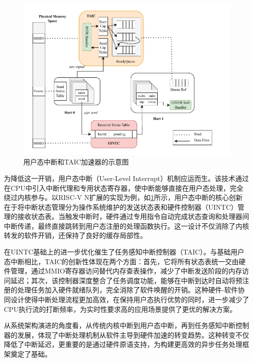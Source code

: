 \begin{figure}[htbp]
    \centering
    \includegraphics[width=1.0\textwidth]{figures/uintc_taic.drawio.pdf}
    \caption{用户态中断和TAIC加速器的示意图}\label{fig:uintc_taic}
\end{figure}

为降低这一开销，用户态中断（User-Level Interrupt）\cite{mehta2021x86}机制应运而生。该技术通过在CPU中引入中断代理和专用状态寄存器，使中断能够直接在用户态处理，完全绕过内核参与。以RISC-V N扩展的实现为例，如\ref{fig:uintc_taic}所示，用户态中断的核心创新在于将中断状态管理分为操作系统维护的发送状态表和硬件控制器（UINTC）管理的接收状态表。当触发中断时，硬件通过专用指令自动完成状态查询和处理器间中断传递，最终直接跳转到用户态注册的处理函数执行。这一设计不仅消除了内核转发的软件开销，还保持了良好的缓存局部性。


在UINTC基础上的进一步优化催生了任务感知中断控制器（TAIC）\cite{taic_github}。与基础用户态中断相比，TAIC的创新性体现在两个方面：首先，它将所有状态表统一交由硬件管理，通过MMIO寄存器访问替代内存查表操作，减少了中断发送阶段的内存访问延迟；其次，该控制器深度整合了任务调度功能，能够在中断到达时自动将预注册的处理任务加入硬件就绪队列，完全消除了软件唤醒的开销。这种硬件-软件协同设计使得中断处理流程更加高效，在保持用户态执行优势的同时，进一步减少了CPU执行流的打断频率，为实时性要求高的应用场景提供了更优的解决方案。

从系统架构演进的角度看，从传统内核中断到用户态中断，再到任务感知中断控制器的发展，体现了中断处理机制从软件主导到硬件加速的转变趋势\cite{song2021hardware}。这种转变不仅降低了中断延迟，更重要的是通过硬件原语支持，为构建更高效的异步任务处理框架奠定了基础。


